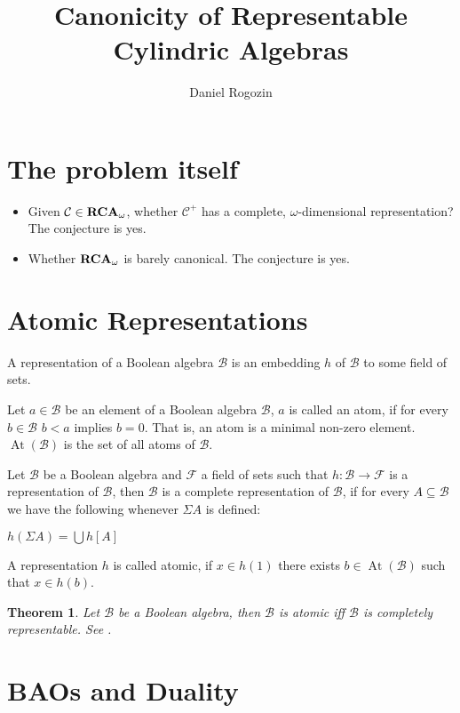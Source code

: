 \documentclass[a4paper]{article}
\author{Daniel Rogozin}
\date{}
\title{Canonicity of Representable Cylindric Algebras}
\theoremstyle{defin}
\theoremstyle{theorem}
\newtheorem{theorem}{Theorem}
\theoremstyle{claim}
\theoremstyle{prop}
\theoremstyle{lemma}
\theoremstyle{fact}
\theoremstyle{ex}
\theoremstyle{col}
\begin{document}
\maketitle

\section{The problem itself}

\begin{itemize}
\item Given $\mathcal{C} \in {\bf RCA}_{\omega}$, whether $\mathcal{C}^{+}$ has a complete, $\omega$-dimensional representation? The conjecture is yes. \cite{hirsch2002relation}
\item Whether ${\bf RCA}_{\omega}$ is barely canonical. The conjecture is yes.
\end{itemize}
\section{Atomic Representations}

A representation of a Boolean algebra $\mathcal{B}$ is an embedding $h$ of $\mathcal{B}$ to some field of sets.

Let $a \in \mathcal{B}$ be an element of a Boolean algebra $\mathcal{B}$, $a$ is called an atom, if for every $b \in \mathcal{B}$
$b < a$ implies $b = 0$. That is, an atom is a minimal non-zero element. $\operatorname{At}(\mathcal{B})$ is the set of all atoms
of $\mathcal{B}$.

Let $\mathcal{B}$ be a Boolean algebra and $\mathcal{F}$ a field of sets such that $h : \mathcal{B} \to \mathcal{F}$ is a
representation of $\mathcal{B}$, then $\mathcal{B}$ is a complete representation of $\mathcal{B}$, if for every
$A \subseteq \mathcal{B}$ we have the following whenever $\Sigma A$ is defined:
\begin{center}
  $h(\Sigma A) = \bigcup h[A]$
\end{center}

A representation $h$ is called atomic, if $x \in h(1)$ there exists $b \in \operatorname{At}(\mathcal{B})$ such that $x \in h(b)$.

\begin{theorem} \label{completeboolean}
  Let $\mathcal{B}$ be a Boolean algebra, then $\mathcal{B}$ is atomic iff $\mathcal{B}$ is completely representable. See \cite[Corollary 6]{hirsch1997complete}.
\end{theorem}

\section{BAOs and Duality}
\end{document}
